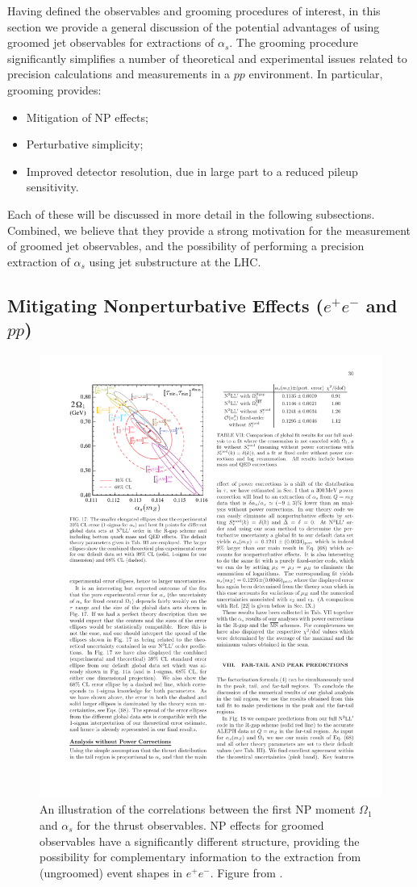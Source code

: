 
Having defined the observables and grooming procedures of interest, in this section we provide a general discussion of the potential advantages of using groomed jet observables for extractions of $\alpha_s$.
%
The grooming procedure significantly simplifies a number of theoretical and experimental issues related to precision calculations and measurements in a $pp$ environment.
%
In particular, grooming provides:
%
\begin{itemize}
\item Mitigation of NP effects;
\item Perturbative simplicity;
\item Improved detector resolution, due in large part to a reduced pileup sensitivity.
\end{itemize}
%
Each of these will be discussed in more detail in the following subsections.
%
Combined, we believe that they provide a strong motivation for the measurement of  groomed jet observables, and the possibility of performing a precision extraction of $\alpha_s$ using jet substructure at the LHC.

\subsection{Mitigating Nonperturbative Effects ($e^+e^-$ and $pp$)}

\begin{figure}[t]
\begin{center}
\includegraphics[width = 0.6\columnwidth]{figures/correlation_firstmoment.pdf}
\end{center}
\caption{An illustration of the correlations between the first NP moment $\Omega_1$ and $\alpha_s$ for the thrust observables.
%
NP effects for groomed observables have a significantly different structure, providing the possibility for complementary information to the extraction from (ungroomed) event shapes in $e^+e^-$.
%
Figure from .}
\label{fig:correlation_firstmoment}
\end{figure}

